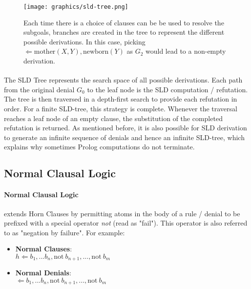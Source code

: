 \documentclass{article}
\theoremstyle{plain}
\theoremstyle{definition}
\begin{document}
\begin{multicols}{2}
\begin{figure}[H]
\centering
\texttt{[image: graphics/sld-tree.png]}
\caption{Each time there is a choice of clauses can be be used to resolve the subgoals, branches are created in the tree to represent the different possible derivations. In this case, picking $\Leftarrow \text{mother}(X, Y), \text{newborn}(Y)$ as $G_2$ would lead to a non-empty derivation. }
\end{figure}

\paragraph{} The SLD Tree represents the search space of all possible derivations. Each path from the original denial $G_0$ to the leaf node is the SLD computation / refutation. The tree is then traversed in a depth-first search to provide each refutation in order. For a finite SLD-tree, this strategy is complete. Whenever the traversal reaches a leaf node of an empty clause, the substitution of the completed refutation is returned. As mentioned before, it is also possible for SLD derivation to generate an infinite sequence of denials and hence an infinite SLD-tree, which explains why sometimes Prolog computations do not terminate.

\subsection{Normal Clausal Logic}\label{sec:NormalClausalLogic}

\paragraph{Normal Clausal Logic} extends Horn Clauses by permitting atoms in the body of a rule / denial to be prefixed with a special operator \textit{not} (read as "fail"). This operator is also referred to as "negation by failure". For example:

\begin{itemize}
\setlength\itemsep{0.1em}
\item[] \textbf{Normal Clauses}:\\ $h \Leftarrow b_1, ... b_n, \text{not}\ b_{n+1}, ..., \text{not}\ b_m$
\item[] \textbf{Normal Denials}:\\ $\Leftarrow b_1, ... b_n, \text{not}\ b_{n+1}, ..., \text{not}\ b_m$
\end{itemize}


\end{multicols}
\end{document}
